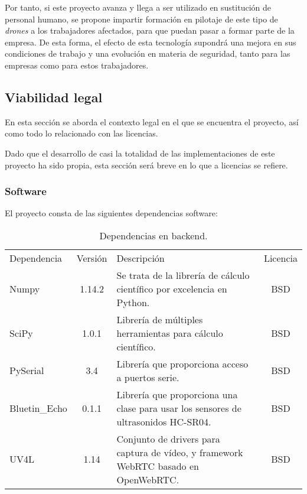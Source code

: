 Por tanto, si este proyecto avanza y llega a ser utilizado en sustitución de personal humano, se propone impartir formación en pilotaje de este tipo de \emph{drones} a los trabajadores afectados, para que puedan pasar a formar parte de la empresa. De esta forma, el efecto de esta tecnología supondrá una mejora en sus condiciones de trabajo y una evolución en materia de seguridad, tanto para las empresas como para estos trabajadores.


\subsection{Viabilidad legal}

En esta sección se aborda el contexto legal en el que se encuentra el proyecto, así como todo lo relacionado con las licencias. 

Dado que el desarrollo de casi la totalidad de las implementaciones de este proyecto ha sido propia, esta sección será breve en lo que a licencias se refiere. 

\subsubsection{Software}
El proyecto consta de las siguientes dependencias software:

\begin{table}[H]
\begin{center}
		\begin{tabular}{l | c | m{6cm} | c}\hline
			\toprule
			Dependencia & Versión & Descripción & Licencia\\
			\otoprule
			Numpy & 1.14.2 & Se trata de la librería de cálculo científico por excelencia en Python.  & BSD  \\
			SciPy & 1.0.1 & Librería de múltiples herramientas para cálculo científico.  & BSD\\
			PySerial & 3.4 & Librería que proporciona acceso a puertos serie. & BSD\\
			Bluetin\_Echo & 0.1.1 & Librería que proporciona una clase para usar los sensores de ultrasonidos HC-SR04. & BSD\\
			UV4L & 1.14 & Conjunto de drivers para captura de vídeo, y framework WebRTC basado en OpenWebRTC. & BSD\\
			
			\hline
			\bottomrule
		\end{tabular}
		\caption{Dependencias en backend.}
		\label{tb:licensebackend}
		\end{center}
\end{table}

